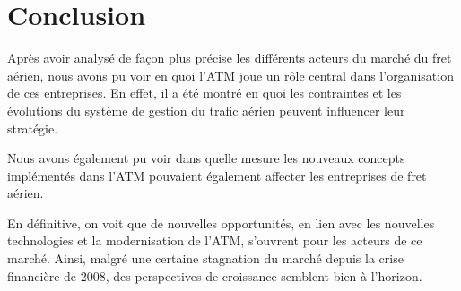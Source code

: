 \section*{Conclusion}


Après avoir analysé de façon plus précise les différents acteurs du marché du fret aérien, nous avons pu voir en quoi l'ATM joue un rôle central dans l'organisation de ces entreprises. En effet, il a été montré en quoi les contraintes et les évolutions du système de gestion du trafic aérien peuvent influencer leur stratégie.


Nous avons également pu voir dans quelle mesure les nouveaux concepts implémentés dans l'ATM pouvaient également affecter les entreprises de fret aérien.


En définitive, on voit que de nouvelles opportunités, en lien avec les nouvelles technologies et la modernisation de l'ATM, s'ouvrent pour les acteurs de ce marché. Ainsi, malgré une certaine stagnation du marché depuis la crise financière de 2008, des perspectives de croissance semblent bien à l'horizon.